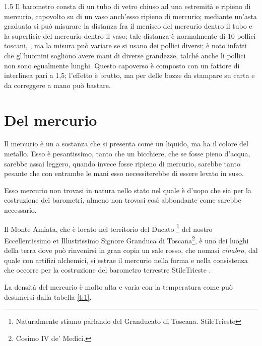 \documentclass[%
corpo=12pt,
twoside,
stile=classica,
tipotesi=magistrale,
folioinhead,
]{toptesi}
\begin{document}
\begin{interlinea}{1.5}
Il barometro consta di un tubo di vetro chiuso ad una estremità e
ripieno di mercurio, capovolto su di un vaso anch'esso ripieno di
mercurio; mediante un'asta graduata si può misurare la distanza fra
il menisco del mercurio dentro il tubo e la superficie del mercurio
dentro il vaso; tale distanza è normalmente di 10 pollici toscani,
\cite{tor1,tor2}, ma la misura può variare se si usano dei pollici
diversi; è noto infatti che gl'huomini sogliono avere mani di
diverse grandezze, talché anche li pollici non sono egualmente
lunghi. Questo capoverso è composto con un fattore di interlinea pari a 1,5; l'effetto è brutto, ma per delle bozze da stampare su carta e da correggere a mano può bastare.
\end{interlinea}
\section{Del mercurio}
Il mercurio è un a sostanza che si presenta come un liquido, ma ha il colore
del metallo. Esso è pesantissimo, tanto che un bicchiere, che se fosse pieno
d'acqua, sarebbe assai leggero, quando invece fosse ripieno di mercurio,
sarebbe tanto pesante che con entrambe le mani esso necessiterebbe di essere
levato in suso.

Esso mercurio non trovasi in natura nello stato nel quale è d'uopo che sia
per la costruzione dei barometri, almeno non trovasi così abbondante come
sarebbe necessario.

\setcounter{footnote}{25}

Il Monte Amiata, che è locato nel territorio del Ducato%
\footnote{Naturalmente stiamo parlando del Granducato di Toscana.%
\expandafter\ifx\csname StileTrieste\endcsname\NoteWhiteLine\fi
}
del nostro Eccellentissimo et Illustrissimo Signore Granduca di Toscana\footnote{Cosimo IV de' Medici.}, è uno dei
luoghi della terra dove può rinvenirsi in gran copia un sale rosso, che
nomasi \emph{cinabro}, dal quale con artifizi alchemici, si estrae il mercurio
nella forma e nella consistenza che occorre per la costruzione del barometro
terrestre%
\expandafter\ifx\csname StileTrieste\endcsname
{}\fi.


La densità del mercurio è molto alta e varia con la temperatura come
può desumersi dalla tabella \ref{t:1}.
\end{document}
